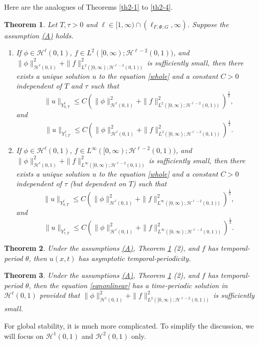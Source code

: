 \documentclass[10pt,a4paper,final]{article}
\numberwithin{equation}{section}
\newtheorem{theorem}{Theorem}[section]
\newcommand{\cH}{\mathcal{H}}
\begin{document}
Here are the analogues of Theorems \ref{th2-1} to \ref{th2-4}. 
\begin{theorem}\label{th6-1}
Let $T, \tau>0$ and $\ell\in [1,\infty)\cap (\ell_{F,\Phi,G},\infty)$. Suppose the assumption \hyperlink{(A)}{(A)} holds.
\begin{enumerate}
    \item If $\phi\in \cH^\ell(0,1)$, $f\in L^2([0,\infty);\cH^{\ell-2}(0,1))$, and $\|\phi\|_{\cH^\ell(0,1)}^2+\|f\|^2_{L^2([0,\infty);\cH^{\ell-2}(0,1))}$ is sufficiently small, then there exists a unique solution $u$ to the equation \eqref{whole} and a constant $C>0$ independent of $T$ and $\tau$ such that 
    $$\|u\|_{Y^{\ell}_{0,T}}\leq C(\|\phi\|_{\cH^\ell(0,1)}^2+\|f\|^2_{L^2([0,\infty);\cH^{\ell-2}(0,1))})^{\frac{1}{2}},$$
    and 
    $$\|u\|_{Y^\ell_{\tau,T}}\leq C(\|\phi\|_{\cH^\ell(0,1)}^2+\|f\|_{L^2([0,\infty);\cH^{\ell-2}(0,1))}^2)^{\frac{1}{2}}.$$
    \item  If $\phi\in \cH^\ell(0,1)$, $f\in L^\infty([0,\infty);\cH^{\ell-2}(0,1))$, and $\|\phi\|_{\cH^\ell(0,1)}^2+\|f\|^2_{L^\infty([0,\infty);\cH^{\ell-2}(0,1))}$ is sufficiently small, then there exists a unique solution $u$ to the equation \eqref{whole} and a constant $C>0$ independent of $\tau$ (but dependent on $T$) such that 
    $$\|u\|_{Y^{\ell}_{0,T}}\leq C(\|\phi\|_{\cH^\ell(0,1)}^2+\|f\|^2_{L^\infty([0,\infty);\cH^{\ell-2}(0,1))})^{\frac{1}{2}},$$
    and 
    $$\|u\|_{Y^\ell_{\tau,T}}\leq C(\|\phi\|_{\cH^\ell(0,1)}^2+\|f\|_{L^\infty([0,\infty);\cH^{\ell-2}(0,1))}^2)^{\frac{1}{2}}.$$
\end{enumerate}
\end{theorem}
\begin{theorem}\label{th6-2}
    Under the assumptions \hyperlink{(A)}{(A)}, Theorem \ref{th6-1} (2), and $f$ has temporal-period $\theta$, then $u(x,t)$ has asymptotic temporal-periodicity.
\end{theorem}
\begin{theorem}\label{th6-3}
        Under the assumptions \hyperlink{(A)}{(A)}, Theorem \ref{th6-1} (2), and $f$ has temporal-period $\theta$, then the equation \eqref{eqnonlinear} has a time-periodic solution in $\cH^{\ell}(0,1)$ provided that $\|\phi\|_{\cH^\ell(0,1)}^2+\|f\|^2_{L^2([0,\infty);\cH^{\ell-2}(0,1))}$ is sufficiently small.
\end{theorem}
For global stability, it is much more complicated. To simplify the discussion, we will focus on $\cH^1(0,1)$ and $\cH^2(0,1)$ only.
\end{document}
